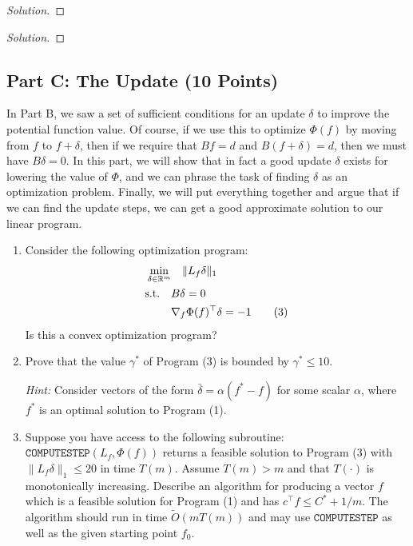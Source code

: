 \documentclass[a4paper,11pt]{article}
\newenvironment{solution}
  {\begin{proof}[Solution]}
  {\end{proof}}
\begin{document}
\begin{solution}
\end{solution}

\begin{solution}
\end{solution}

\subsection*{Part C: The Update (10 Points)}
In Part B, we saw a set of sufficient conditions for an update \(\delta\) to improve the potential function value. Of course, if we use this to optimize \(\Phi(f)\) by moving from \(f\) to \(f + \delta\), then if we require that \(Bf = d\) and \(B(f + \delta) = d\), then we must have \(B\delta = 0\). In this part, we will show that in fact a good update \(\delta\) exists for lowering the value of \(\Phi\), and we can phrase the task of finding \(\delta\) as an optimization problem. Finally, we will put everything together and argue that if we can find the update steps, we can get a good approximate solution to our linear program.

\begin{enumerate}[label=\arabic*.]
    \item Consider the following optimization program:
    \begin{align}
        \min_{\delta \in \mathbb{R}^{m}} &\quad \|L_{f}\delta\|_{1} \notag\\
        \mathrm{s.t.}\quad & B\delta = 0 \notag\\
        & \nabla_{f}\Phi(f)^{\top}\delta = -1 \tag{3}
    \end{align}
    Is this a convex optimization program?
    \item Prove that the value \(\gamma^{*}\) of Program (3) is bounded by \(\gamma^{*}\leq 10\).
    
    \textit{Hint:} Consider vectors of the form \(\bar{\delta} = \alpha(f^{*} - f)\) for some scalar \(\alpha\), where \(f^{*}\) is an optimal solution to Program (1).
    \item Suppose you have access to the following subroutine: \(\texttt{COMPUTESTEP}(L_f,\Phi(f))\) returns a feasible solution to Program (3) with \(\|L_{f}\delta\|_{1}\leq 20\) in time \(T(m)\). Assume \(T(m) > m\) and that \(T(\cdot)\) is monotonically increasing. Describe an algorithm for producing a vector \(f\) which is a feasible solution for Program (1) and has \(c^{\top}f\leq C^{*} + 1/m\). The algorithm should run in time \(\widetilde{O}(mT(m))\) and may use \(\texttt{COMPUTESTEP}\) as well as the given starting point \(f_0\).
\end{enumerate}
\end{document}
